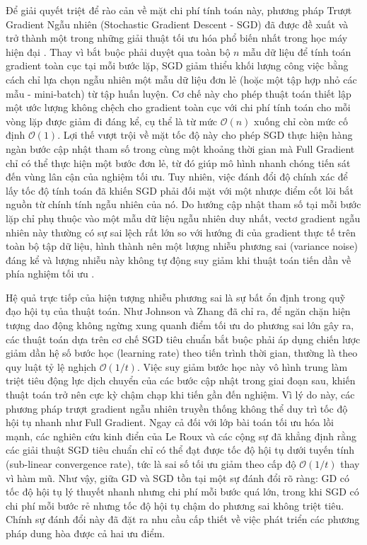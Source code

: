 Để giải quyết triệt để rào cản về mặt chi phí tính toán này, phương pháp Trượt Gradient Ngẫu nhiên (Stochastic Gradient Descent - SGD) đã được đề xuất và trở thành một trong những giải thuật tối ưu hóa phổ biến nhất trong học máy hiện đại \cite{bottou2010large}. Thay vì bắt buộc phải duyệt qua toàn bộ $n$ mẫu dữ liệu để tính toán gradient toàn cục tại mỗi bước lặp, SGD giảm thiểu khối lượng công việc bằng cách chỉ lựa chọn ngẫu nhiên một mẫu dữ liệu đơn lẻ (hoặc một tập hợp nhỏ các mẫu - mini-batch) từ tập huấn luyện. Cơ chế này cho phép thuật toán thiết lập một ước lượng không chệch cho gradient toàn cục với chi phí tính toán cho mỗi vòng lặp được giảm đi đáng kể, cụ thể là từ mức $\mathcal{O}(n)$ xuống chỉ còn mức cố định $\mathcal{O}(1)$. Lợi thế vượt trội về mặt tốc độ này cho phép SGD thực hiện hàng ngàn bước cập nhật tham số trong cùng một khoảng thời gian mà Full Gradient chỉ có thể thực hiện một bước đơn lẻ, từ đó giúp mô hình nhanh chóng tiến sát đến vùng lân cận của nghiệm tối ưu. Tuy nhiên, việc đánh đổi độ chính xác để lấy tốc độ tính toán đã khiến SGD phải đối mặt với một nhược điểm cốt lõi bắt nguồn từ chính tính ngẫu nhiên của nó. Do hướng cập nhật tham số tại mỗi bước lặp chỉ phụ thuộc vào một mẫu dữ liệu ngẫu nhiên duy nhất, vectơ gradient ngẫu nhiên này thường có sự sai lệch rất lớn so với hướng đi của gradient thực tế trên toàn bộ tập dữ liệu, hình thành nên một lượng nhiễu phương sai (variance noise) đáng kể và lượng nhiễu này không tự động suy giảm khi thuật toán tiến dần về phía nghiệm tối ưu \cite{bottou2010large}. 

Hệ quả trực tiếp của hiện tượng nhiễu phương sai là sự bất ổn định trong quỹ đạo hội tụ của thuật toán. Như Johnson và Zhang \cite{johnson2013accelerating} đã chỉ ra, để ngăn chặn hiện tượng dao động không ngừng xung quanh điểm tối ưu do phương sai lớn gây ra, các thuật toán dựa trên cơ chế SGD tiêu chuẩn bắt buộc phải áp dụng chiến lược giảm dần hệ số bước học (learning rate) theo tiến trình thời gian, thường là theo quy luật tỷ lệ nghịch $\mathcal{O}(1/t)$. Việc suy giảm bước học này vô hình trung làm triệt tiêu động lực dịch chuyển của các bước cập nhật trong giai đoạn sau, khiến thuật toán trở nên cực kỳ chậm chạp khi tiến gần đến nghiệm. Vì lý do này, các phương pháp trượt gradient ngẫu nhiên truyền thống không thể duy trì tốc độ hội tụ nhanh như Full Gradient. Ngay cả đối với lớp bài toán tối ưu hóa lồi mạnh, các nghiên cứu kinh điển của Le Roux và các cộng sự \cite{leroux2012stochastic} đã khẳng định rằng các giải thuật SGD tiêu chuẩn chỉ có thể đạt được tốc độ hội tụ dưới tuyến tính (sub-linear convergence rate), tức là sai số tối ưu giảm theo cấp độ $\mathcal{O}(1/t)$ thay vì hàm mũ. Như vậy, giữa GD và SGD tồn tại một sự đánh đổi rõ ràng: GD có tốc độ hội tụ lý thuyết nhanh nhưng chi phí mỗi bước quá lớn, trong khi SGD có chi phí mỗi bước rẻ nhưng tốc độ hội tụ chậm do phương sai không triệt tiêu. Chính sự đánh đổi này đã đặt ra nhu cầu cấp thiết về việc phát triển các phương pháp dung hòa được cả hai ưu điểm.

